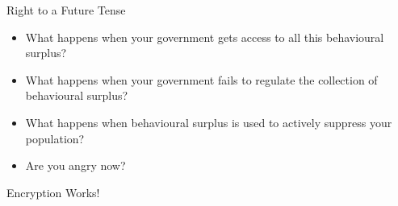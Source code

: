 \documentclass[aspectratio=169]{beamer}
\begin{document}
    {%
    \begin{frame}{Right to a Future Tense}
        \begin{itemize}
            \item What happens when your government gets access to all this
                behavioural surplus?
            \pause{}
            \item What happens when your government fails to regulate the
                collection of behavioural surplus?
            \pause{}
            \item What happens when behavioural surplus is used to actively
                suppress your population?
            \pause{}
            \item Are you angry now?
        \end{itemize}
    \end{frame}
    }

    {%
    \begin{frame}
        \begin{titlebox}
            \centering
            {Encryption Works!}
        \end{titlebox}
    \end{frame}
    }
\end{document}
